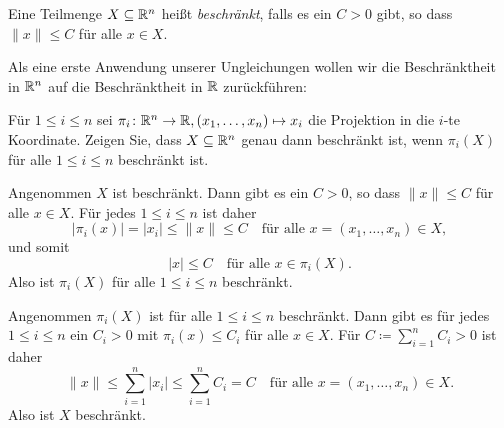 \documentclass[a4paper,10pt]{article}
\begin{document}
\begin{defi}
 Eine Teilmenge $X \subseteq \mathbb{R}^n$ heißt \emph{beschränkt}, falls es ein $C > 0$ gibt, so dass $\|x\| \leq C$ für alle $x \in X$.
\end{defi}


Als eine erste Anwendung unserer Ungleichungen wollen wir die Beschränktheit in $\mathbb{R}^n$ auf die Beschränktheit in $\mathbb{R}$ zurückführen:


\begin{question}\label{qst: Beschränktheit in Koordinaten}
 Für $1 \leq i \leq n$ sei $\pi_i \colon \mathbb{R}^n \to \mathbb{R}, (x_1, \dotsc, x_n) \mapsto x_i$ die Projektion in die $i$-te Koordinate. Zeigen Sie, dass $X \subseteq \mathbb{R}^n$ genau dann beschränkt ist, wenn $\pi_i(X)$ für alle $1 \leq i \leq n$ beschränkt ist.
\end{question}
\begin{solution}
 Angenommen $X$ ist beschränkt. Dann gibt es ein $C > 0$, so dass $\|x\| \leq C$ für alle $x \in X$. Für jedes $1 \leq i \leq n$ ist daher
 \[
  |\pi_i(x)| = |x_i| \leq \|x\| \leq C \quad \text{für alle $x = (x_1, \dotsc, x_n) \in X$},
 \]
 und somit
 \[
  |x| \leq C \quad \text{für alle $x \in \pi_i(X)$}.
 \]
 Also ist $\pi_i(X)$ für alle $1 \leq i \leq n$ beschränkt.
 
 Angenommen $\pi_i(X)$ ist für alle $1 \leq i \leq n$ beschränkt. Dann gibt es für jedes $1 \leq i \leq n$ ein $C_i > 0$ mit $\pi_i(x) \leq C_i$ für alle $x \in X$. Für $C \coloneqq \sum_{i=1}^n C_i > 0$ ist daher
 \[
  \|x\| \leq \sum_{i=1}^n |x_i| \leq \sum_{i=1}^n C_i = C
  \quad \text{für alle $x = (x_1, \dotsc, x_n) \in X$}.
 \]
 Also ist $X$ beschränkt.
\end{solution}
\end{document}
